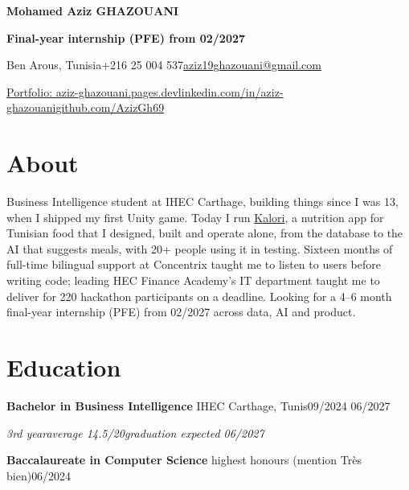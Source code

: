 \documentclass[10pt]{article}
\newcommand{\entry}[3]{\par\vspace{2pt}\textbf{#1}#2\hfill{\color{soft}#3}\par}
\newcommand{\sub}[1]{{\itshape\color{soft}#1\par}}
\newcommand{\sep}{\enspace\textperiodcentered\enspace}
\begin{document}
{\fontsize{21}{24}\selectfont\bfseries Mohamed Aziz GHAZOUANI\par}
\vspace{2pt}
{\color{accent}\bfseries\fontsize{11}{13}\selectfont Final-year internship (PFE) from 02/2027\par}
\vspace{2pt}
{\small Ben Arous, Tunisia\sep +216 25 004 537\sep \href{mailto:aziz19ghazouani@gmail.com}{aziz19ghazouani@gmail.com}\par
\href{https://aziz-ghazouani.pages.dev}{Portfolio: aziz-ghazouani.pages.dev}\sep \href{https://www.linkedin.com/in/aziz-ghazouani/}{linkedin.com/in/aziz-ghazouani}\sep \href{https://github.com/AzizGh69}{github.com/AzizGh69}\par}
\section{About}
Business Intelligence student at IHEC Carthage, building things since I was 13, when I shipped my first Unity game. Today I run \href{https://kalori-app.com}{Kalori}, a nutrition app for Tunisian food that I designed, built and operate alone, from the database to the AI that suggests meals, with 20+ people using it in testing. Sixteen months of full-time bilingual support at Concentrix taught me to listen to users before writing code; leading HEC Finance Academy's IT department taught me to deliver for 220 hackathon participants on a deadline. Looking for a 4--6 month final-year internship (PFE) from 02/2027 across data, AI and product.
\section{Education}
\entry{Bachelor in Business Intelligence}{ \textendash{} IHEC Carthage, Tunis}{09/2024 \textendash{} 06/2027}
\sub{3rd year\sep average 14.5/20\sep graduation expected 06/2027}
\entry{Baccalaureate in Computer Science}{ \textendash{} highest honours (mention Très bien)}{06/2024}
\end{document}
